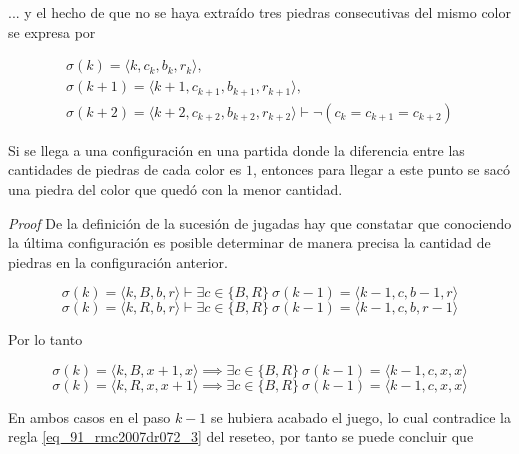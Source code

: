 ... y el hecho de que no se haya extraído tres piedras consecutivas del mismo color se expresa por 

\begin{equation} \label{eq_91_rmc2007dr072_5}
\begin{gathered}
	\sigma(k) = \langle k, c_k, b_k, r_k \rangle , \\
	\sigma(k+1) = \langle k+1, c_{k+1}, b_{k+1}, r_{k+1} \rangle, \\
	\sigma(k+2) = \langle k+2, c_{k+2}, b_{k+2}, r_{k+2} \rangle \vdash \neg (c_{k} = c_{k+1} = c_{k+2})
\end{gathered}
\end{equation}

\begin{claim}
	Si se llega a una configuración en una partida donde la diferencia entre las cantidades de piedras de cada color es $1$, entonces para llegar a este punto se sacó una piedra del color que quedó con la menor cantidad.
\end{claim}

\textit{Proof} De la definición de la sucesión de jugadas hay que constatar que conociendo la última configuración es posible determinar de manera precisa la cantidad de piedras en la configuración anterior.

\begin{equation} \label{eq_91_rmc2007dr072_6}
	\sigma(k) = \langle k, B, b, r \rangle \vdash \exists c \in \{B,R\}\ \sigma(k-1) = \langle k-1, c, b-1, r \rangle
\end{equation}
\begin{equation} \label{eq_91_rmc2007dr072_7}
	\sigma(k) = \langle k, R, b, r \rangle \vdash \exists c \in \{B,R\}\ \sigma(k-1) = \langle k-1, c, b, r-1 \rangle
\end{equation}

Por lo tanto 

\begin{equation} \label{eq_91_rmc2007dr072_8}
	\sigma(k) = \langle k, B, x+1, x \rangle \implies \exists c \in \{B,R\}\ \sigma(k-1) = \langle k-1, c, x, x \rangle
\end{equation}
\begin{equation} \label{eq_91_rmc2007dr072_9}
	\sigma(k) = \langle k, R, x, x+1 \rangle \implies \exists c \in \{B,R\}\ \sigma(k-1) = \langle k-1, c, x, x \rangle
\end{equation}

En ambos casos en el paso $k-1$ se hubiera acabado el juego, lo cual contradice la regla \cref{eq_91_rmc2007dr072_3} del reseteo, por tanto se puede concluir que

